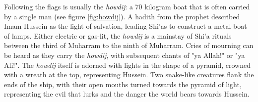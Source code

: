 Following the flags is usually the \emph{howdij}: a 70 kilogram boat that is often carried by a single man (see figure \ref{fig:howdij}). A hadith from the prophet described Imam Hussein as the light of salvation, leading Shi'as to construct a metal boat of lamps. Either electric or gas-lit, the \emph{howdij} is a mainstay of Shi'a rituals between the third of Muharram to the ninth of Muharram. Cries of mourning can be heard as they carry the \emph{howdij}, with subsequent chants of "ya Allah!" or "ya Ali!". The \emph{howdij} itself is adorned with lights in the shape of a pyramid, crowned with a wreath at the top, representing Hussein. Two snake-like creatures flank the ends of the ship, with their open mouths turned towards the pyramid of light, representing the evil that lurks and the danger the world bears towards Hussein. 

